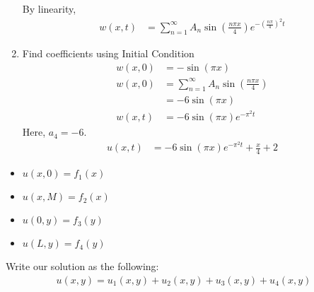 \begin{enumerate}
  By linearity,
  \begin{align}
    w(x, t) & = \sum^\infty_{n = 1} A_n \sin\left(\frac{n \pi x}{4} \right)e^{-\left( \frac{n \pi}{4} \right)^2 t}
  \end{align}

  \item Find coefficients using Initial Condition
  \begin{align}
    w(x, 0) & = -\sin(\pi x)\\
    w(x, 0) & = \sum^\infty_{n = 1} A_n \sin\left(\frac{n \pi x}{4}\right)\\
    & = -6 \sin(\pi x)\\
    w(x, t) & = -6 \sin(\pi x) e^{-\pi^2 t}
  \end{align}
  Here, $a_4 = -6$.
  \begin{align}
    u(x, t) & = -6 \sin(\pi x)e^{-\pi^2 t} + \frac{x}{4} + 2
  \end{align}
\end{enumerate}
\begin{itemize}
  \item $u(x, 0) = f_1(x)$
  \item $u(x, M) = f_2(x)$
  \item $u(0, y) = f_3(y)$
  \item $u(L, y) = f_4(y)$
\end{itemize}

Write our solution as the following:
\begin{align}
  u(x, y) = u_1(x, y) + u_2(x, y) + u_3(x, y) + u_4(x, y)
\end{align}

